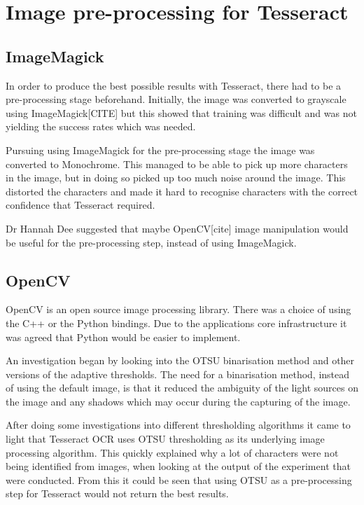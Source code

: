 \chapter{Image pre-processing for Tesseract}
\section{ImageMagick}
In order to produce the best possible results with Tesseract, there had to be a pre-processing stage beforehand. Initially, the image was converted to grayscale using ImageMagick[CITE] but this showed that training was difficult and was not yielding the success rates which was needed.

Pursuing using ImageMagick for the pre-processing stage the image was converted to Monochrome. This managed to be able to pick up more characters in the image, but in doing so picked up too much noise around the image. This distorted the characters and made it hard to recognise characters with the correct confidence that Tesseract required.

Dr Hannah Dee suggested that maybe OpenCV[cite] image manipulation would be useful for the pre-processing step, instead of using ImageMagick.

\section{OpenCV}
OpenCV is an open source image processing library. There was a choice of using the C++ or the Python bindings. Due to the applications core infrastructure it was agreed that Python would be easier to implement.

An investigation began by looking into the OTSU binarisation method and other versions of the adaptive thresholds. The need for a binarisation method, instead of using the default image, is that it reduced the ambiguity of the light sources on the image and any shadows which may occur during the capturing of the image.

After doing some investigations into different thresholding algorithms it came to light that Tesseract OCR uses OTSU thresholding as its underlying image processing algorithm. This quickly explained why a lot of characters were not being identified from images, when looking at the output of the experiment that were conducted. From this it could be seen that using OTSU as a pre-processing step for Tesseract would not return the best results.

